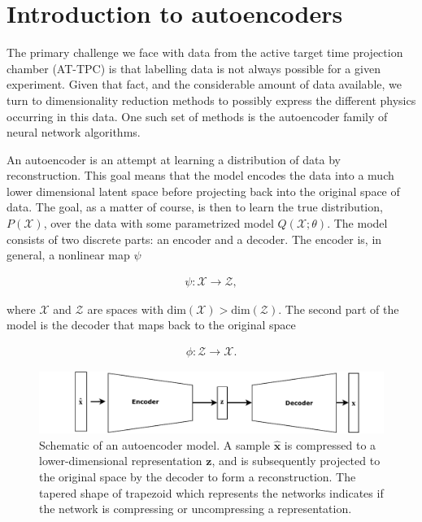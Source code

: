 

\section{Introduction to autoencoders}\label{sec:intro_autoenc}

The primary challenge we face with data from the active target time projection chamber (AT-TPC) is that labelling data is not always possible for a given experiment. Given that fact, and the considerable amount of data available, we turn to dimensionality reduction methods to possibly express the different physics occurring in this data. One such set of methods is the autoencoder family of neural network algorithms.

An autoencoder is an attempt at learning a distribution of data by reconstruction. This goal means that the model encodes the data into a much lower dimensional latent space before projecting back into the original space of data. The goal, as a matter of course, is then to learn the true distribution, $P(\mathcal{X})$, over the data with some parametrized model $Q(\mathcal{X};\theta)$. The model consists of two discrete parts: an encoder and a decoder. The encoder is, in general, a nonlinear map $\psi$

\begin{align}
  \psi: \mathcal{X} \rightarrow \mathcal{Z},
\end{align}

\noindent where $\mathcal{X} $ and $\mathcal{Z}$ are spaces with $\text{dim}(\mathcal{X}) > \text{dim}(\mathcal{Z})$.
The second part of the model is the decoder that maps back to the original space


\begin{align}
  \phi: \mathcal{Z} \rightarrow \mathcal{X}.
\end{align}

\begin{figure}[tb]
    \centering
    \includegraphics[width=\textwidth]{plots/autoencoder.pdf}
    \caption[Autoencoder schematic]{Schematic of an autoencoder model. A sample $\hat{\boldsymbol{x}}$ is compressed to a lower-dimensional representation $\boldsymbol{z}$, and is subsequently projected to the original space by the decoder to form a reconstruction. The tapered shape of trapezoid which represents the networks indicates if the network is compressing or uncompressing a representation.}
    \label{fig:autoencoder}
\end{figure}

